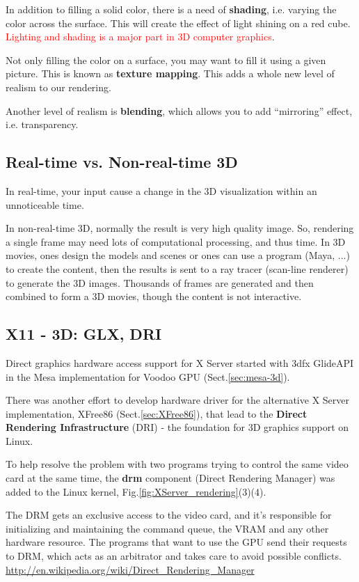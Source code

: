 In addition to filling a solid color, there is a need of {\bf
  shading}, i.e. varying the color across the surface. This will
create the effect of light shining on a red cube. 
\textcolor{red}{Lighting and shading is a major part in 3D computer
  graphics}. 


Not only filling the color on a surface, you may want to fill it using
a given picture. This is known as {\bf texture mapping}. This adds a
whole new level of realism to our rendering. 

Another level of realism is {\bf blending}, which allows you to add
``mirroring'' effect, i.e. transparency. 


\subsection{Real-time vs. Non-real-time 3D}
\label{sec:real-time-vs}

In real-time, your input cause a change in the 3D visualization within
an unnoticeable time. 

In non-real-time 3D, normally the result is very high quality
image. So, rendering a single frame may need lots of computational
processing, and thus time. In 3D movies, ones design the models and
scenes or ones can use a program (Maya, ...) to create the content,
then the results is sent to a ray tracer (scan-line renderer) to
generate the 3D images.  Thousands of frames are generated and then
combined to form a 3D movies, though the content is not interactive.
\subsection{X11 - 3D: GLX, DRI}
\label{sec:X11-3D}

Direct graphics hardware access support for X Server started with 3dfx GlideAPI
in the Mesa implementation for Voodoo GPU (Sect.\ref{sec:mesa-3d}).

There was another effort to develop hardware driver for the alternative X Server
implementation, XFree86 (Sect.\ref{sec:XFree86}), that lead to
the {\bf Direct Rendering Infrastructure} (DRI) - the foundation for 3D graphics
support on Linux. 

To help resolve the problem with two programs trying to control the same video
card at the same time, the {\bf drm} component (Direct Rendering Manager) was
added to the Linux kernel, Fig.\ref{fig:XServer_rendering}(3)(4).

The DRM gets an exclusive access to the video card, and it's responsible for
initializing and maintaining the command queue, the VRAM and any other hardware
resource. The programs that want to use the GPU send their requests to DRM,
which acts as an arbitrator and takes care to avoid possible conflicts.
\url{http://en.wikipedia.org/wiki/Direct_Rendering_Manager}

